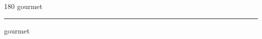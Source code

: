 
\begin{frame}
\begin{center}
\begin{turn}{180}
{\fontsize{2.5cm}{1em}\selectfont gourmet}
\end{turn}
\vspace{1em}\par  
\hrule
\vspace{1em}\par  
{\fontsize{2.5cm}{1em}\selectfont gourmet}
\end{center}
\end{frame}
